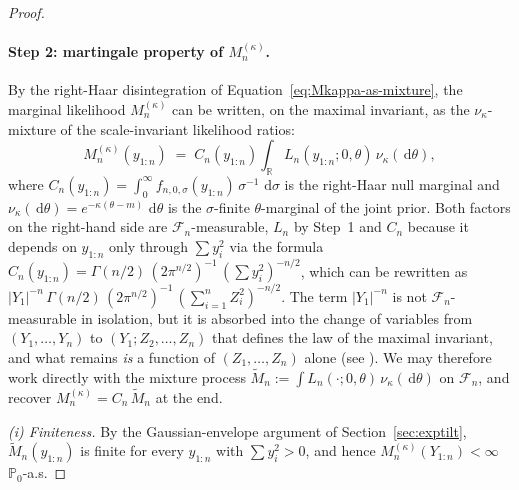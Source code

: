 \documentclass[12pt, a4paper]{report}
\newcommand{\dd}{\,\mathrm{d}}
\newcommand{\1}{\mathbf{1}}
\begin{document}
\begin{proof}
\paragraph{Step 2: martingale property of $M_n^{(\kappa)}$.}
By the right-Haar disintegration of Equation~\eqref{eq:Mkappa-as-mixture}, the marginal likelihood $M_n^{(\kappa)}$ can be written, on the maximal invariant,
as the $\nu_\kappa$-mixture of the scale-invariant likelihood ratios:
\begin{equation}\label{eq:M-as-mixture-Ln}
   M_n^{(\kappa)}(y_{1:n})
   \;=\; C_n(y_{1:n})\int_\mathbb{R} L_n(y_{1:n};0,\theta)\,\nu_\kappa(\dd\theta),
\end{equation}
where $C_n(y_{1:n}) = \int_0^\infty f_{n,0,\sigma}(y_{1:n})\,\sigma^{-1}\,\dd\sigma$
is the right-Haar null marginal and $\nu_\kappa(\dd\theta) = e^{-\kappa(\theta-m)}\,\dd\theta$
is the $\sigma$-finite $\theta$-marginal of the joint prior. Both factors on
the right-hand side are $\mathcal{F}_n$-measurable, $L_n$ by Step~1 and $C_n$ because it depends on $y_{1:n}$ only
through $\sum y_i^2$ via the formula
$C_n(y_{1:n}) = \Gamma(n/2)\,(2\pi^{n/2})^{-1}\,(\sum y_i^2)^{-n/2}$, which can be rewritten as
$|Y_1|^{-n}\,\Gamma(n/2)\,(2\pi^{n/2})^{-1}\,(\sum_{i=1}^n Z_i^2)^{-n/2}$. The term $|Y_1|^{-n}$ is not $\mathcal{F}_n$-measurable in isolation, but it is absorbed into the change of variables from $(Y_1,\dots,Y_n)$ to
$(Y_1; Z_2,\dots,Z_n)$ that defines the law of the maximal invariant, and
what remains \emph{is} a function of $(Z_1,\dots,Z_n)$ alone (see
\cite[proof of Cor.~4.6]{Wang2025}). We may therefore work directly with the
mixture process $\widetilde M_n := \int L_n(\cdot;0,\theta)\,\nu_\kappa(\dd\theta)$
on $\mathcal{F}_n$, and recover $M_n^{(\kappa)} = C_n\,\widetilde M_n$ at the
end.

\smallskip\noindent\emph{(i) Finiteness.}
By the Gaussian-envelope argument of Section~\ref{sec:exptilt},
$\widetilde M_n(y_{1:n})$ is finite for every $y_{1:n}$ with $\sum y_i^2 > 0$,
and hence $M_n^{(\kappa)}(Y_{1:n}) < \infty$ $\mathbb{P}_0$-a.s.


\end{proof}
\end{document}
